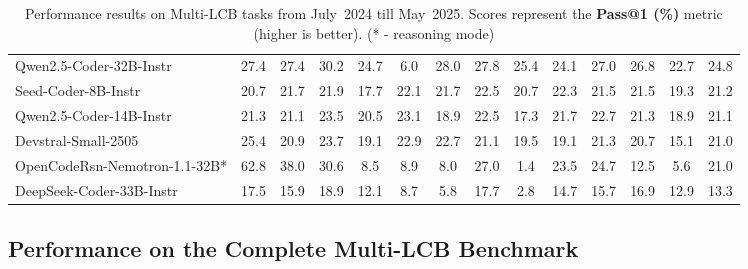 \documentclass{llmxive}
\begin{document}
\begin{table}[hbt]
{\begin{tabular}{l *{13}{c}}
Qwen2.5-Coder-32B-Instr        & 27.4 & 27.4 & 30.2 & 24.7 & 6.0  & 28.0 & 27.8 & 25.4 & 24.1 & 27.0 & 26.8 & 22.7 & 24.8 \\
\rowcolor{gray!10}
Seed-Coder-8B-Instr            & 20.7 & 21.7 & 21.9 & 17.7 & 22.1 & 21.7 & 22.5 & 20.7 & 22.3 & 21.5 & 21.5 & 19.3 & 21.2 \\
Qwen2.5-Coder-14B-Instr        & 21.3 & 21.1 & 23.5 & 20.5 & 23.1 & 18.9 & 22.5 & 17.3 & 21.7 & 22.7 & 21.3 & 18.9 & 21.1 \\
\rowcolor{gray!10}
Devstral-Small-2505            & 25.4 & 20.9 & 23.7 & 19.1 & 22.9 & 22.7 & 21.1 & 19.5 & 19.1 & 21.3 & 20.7 & 15.1 & 21.0 \\
OpenCodeRsn-Nemotron-1.1-32B* & 62.8 & 38.0 & 30.6 & 8.5  & 8.9  & 8.0  & 27.0 & 1.4  & 23.5 & 24.7 & 12.5 & 5.6  & 21.0 \\
\rowcolor{gray!10}
DeepSeek-Coder-33B-Instr       & 17.5 & 15.9 & 18.9 & 12.1 & 8.7  & 5.8  & 17.7 & 2.8  & 14.7 & 15.7 & 16.9 & 12.9 & 13.3 \\

\bottomrule
\end{tabular}%
}
\caption{Performance results on Multi-LCB tasks from July~2024 till May~2025. 
Scores represent the \textbf{Pass@1 (\%)} metric (higher is better). (* - reasoning mode)}
\label{tab_exps_july24}
\end{table}



\subsection{Performance on the Complete Multi-LCB Benchmark}
\end{document}
